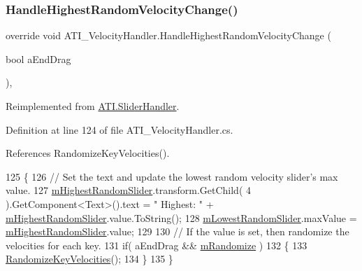 \subsubsection{\texorpdfstring{Handle\+Highest\+Random\+Velocity\+Change()}{HandleHighestRandomVelocityChange()}}
{\footnotesize\ttfamily override void A\+T\+I\+\_\+\+Velocity\+Handler.\+Handle\+Highest\+Random\+Velocity\+Change (\begin{DoxyParamCaption}\item[{bool}]{a\+End\+Drag }\end{DoxyParamCaption})\hspace{0.3cm}{\ttfamily [protected]}, {\ttfamily [virtual]}}



Reimplemented from \hyperlink{class_a_t_i_1_1_slider_handler_a827fab40da8ee6e777cbed4b5a9ae712}{A\+T\+I.\+Slider\+Handler}.



Definition at line 124 of file A\+T\+I\+\_\+\+Velocity\+Handler.\+cs.



References Randomize\+Key\+Velocities().


\begin{DoxyCode}
125     \{
126         \textcolor{comment}{// Set the text and update the lowest random velocity slider's max value.}
127         \hyperlink{class_a_t_i___velocity_handler_aec243511d869243292e215a24e87f192}{mHighestRandomSlider}.transform.GetChild( 4 ).GetComponent<Text>().text = \textcolor{stringliteral}{"
      Highest: "} + \hyperlink{class_a_t_i___velocity_handler_aec243511d869243292e215a24e87f192}{mHighestRandomSlider}.value.ToString();
128         \hyperlink{class_a_t_i___velocity_handler_aba4ceb157ad404a47cedb3583e81d194}{mLowestRandomSlider}.maxValue = \hyperlink{class_a_t_i___velocity_handler_aec243511d869243292e215a24e87f192}{mHighestRandomSlider}.value;
129 
130         \textcolor{comment}{// If the value is set, then randomize the velocities for each key.}
131         \textcolor{keywordflow}{if}( aEndDrag && \hyperlink{class_a_t_i___velocity_handler_aa6f4ac16382d37eb2c66fb358ac87301}{mRandomize} )
132         \{
133             \hyperlink{class_a_t_i___velocity_handler_aa1a10281dafc6666677e4255ad663dde}{RandomizeKeyVelocities}();
134         \}
135     \}
\end{DoxyCode}
\mbox{\label{class_a_t_i___velocity_handler_a17b6e0de9e45dfb9dba1ea4f2c0a122c}} 
